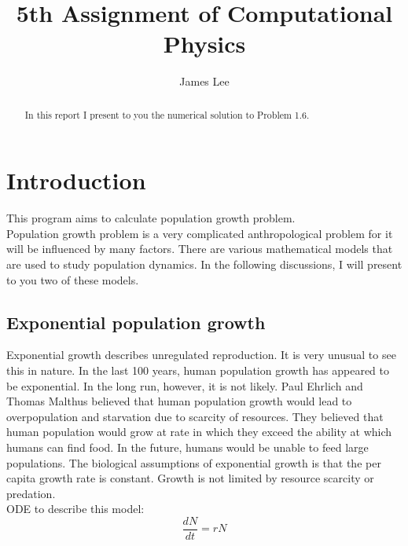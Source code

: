 \documentclass[10pt,a4paper]{article}
\author{James Lee}
\title{5th Assignment of Computational Physics}
\begin{document}
	\maketitle
	\begin{abstract}
		In this report I present to you the numerical solution to Problem 1.6.
	\end{abstract}
	\section{Introduction}
	This program aims to calculate population growth problem.\\
	Population growth problem is a very complicated anthropological problem for it will be influenced by many factors. There are various mathematical models that are used to study population dynamics. In the following discussions, I will present to you two of these models.
	\subsection{Exponential population growth}
	Exponential growth describes unregulated reproduction. It is very unusual to see this in nature. In the last 100 years, human population growth has appeared to be exponential. In the long run, however, it is not likely. Paul Ehrlich and Thomas Malthus believed that human population growth would lead to overpopulation and starvation due to scarcity of resources. They believed that human population would grow at rate in which they exceed the ability at which humans can find food. In the future, humans would be unable to feed large populations. The biological assumptions of exponential growth is that the per capita growth rate is constant. Growth is not limited by resource scarcity or predation.\\
	ODE to describe this model:
	\begin{equation}
	\frac{dN}{dt}=rN
	\end{equation}
\end{document}
